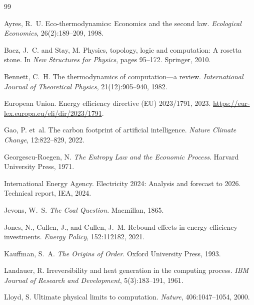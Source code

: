 \documentclass[10pt,twocolumn]{article}
\theoremstyle{plain}
\theoremstyle{definition}
\theoremstyle{remark}
\begin{document}

\begin{thebibliography}{99}

Ayres, R.~U.
\newblock Eco-thermodynamics: Economics and the second law.
\newblock \emph{Ecological Economics}, 26(2):189--209, 1998.

Baez, J.~C. and Stay, M.
\newblock Physics, topology, logic and computation: A rosetta stone.
\newblock In \emph{New Structures for Physics}, pages 95--172. Springer, 2010.

Bennett, C.~H.
\newblock The thermodynamics of computation---a review.
\newblock \emph{International Journal of Theoretical Physics},
  21(12):905--940, 1982.

European Union.
\newblock Energy efficiency directive (EU) 2023/1791, 2023.
\newblock \url{https://eur-lex.europa.eu/eli/dir/2023/1791}.

Gao, P. et~al.
\newblock The carbon footprint of artificial intelligence.
\newblock \emph{Nature Climate Change}, 12:822--829, 2022.

Georgescu-Roegen, N.
\newblock \emph{The Entropy Law and the Economic Process}.
\newblock Harvard University Press, 1971.

International Energy Agency.
\newblock Electricity 2024: Analysis and forecast to 2026.
\newblock Technical report, IEA, 2024.

Jevons, W.~S.
\newblock \emph{The Coal Question}.
\newblock Macmillan, 1865.

Jones, N., Cullen, J., and Cullen, J.~M.
\newblock Rebound effects in energy efficiency investments.
\newblock \emph{Energy Policy}, 152:112182, 2021.

Kauffman, S.~A.
\newblock \emph{The Origins of Order}.
\newblock Oxford University Press, 1993.

Landauer, R.
\newblock Irreversibility and heat generation in the computing process.
\newblock \emph{IBM Journal of Research and Development}, 5(3):183--191, 1961.

Lloyd, S.
\newblock Ultimate physical limits to computation.
\newblock \emph{Nature}, 406:1047--1054, 2000.


\end{thebibliography}
\end{document}
